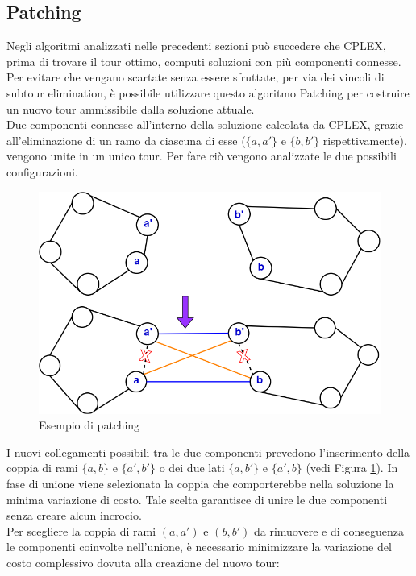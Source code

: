 \subsection{Patching}
Negli algoritmi analizzati nelle precedenti sezioni può succedere che CPLEX, prima di trovare il tour ottimo, computi soluzioni con più componenti connesse. Per evitare che vengano scartate senza essere sfruttate, per via dei vincoli di subtour elimination, è possibile utilizzare questo algoritmo Patching per costruire un nuovo tour ammissibile dalla soluzione attuale.\\
Due componenti connesse all'interno della soluzione calcolata da CPLEX, grazie all'eliminazione di un ramo da ciascuna di esse ($\{a, a'\}$ e  $\{b, b'\}$ rispettivamente), vengono unite in un unico tour. Per fare ciò vengono analizzate le due possibili configurazioni.\\
\begin{figure}[H] 
\begin{center} 
  \includegraphics[scale=0.3]{Images/patching}
  \caption{\footnotesize{Esempio di patching}} \label{patching} 
\end{center} 
\end{figure}
I nuovi collegamenti possibili tra le due componenti prevedono l'inserimento della coppia di rami $\{a, b\}$ e $\{a', b'\}$ o dei due lati $\{a, b'\}$ e $\{a', b\}$ (vedi Figura \ref{patching}). In fase di unione viene selezionata la coppia che comporterebbe nella soluzione la minima variazione di costo. Tale scelta garantisce di unire le due componenti senza creare alcun incrocio.\\
Per scegliere la coppia di rami $(a, a')$ e $(b, b')$ da rimuovere e di conseguenza le componenti coinvolte nell'unione, è necessario minimizzare la variazione del costo complessivo dovuta alla creazione del nuovo tour: 
